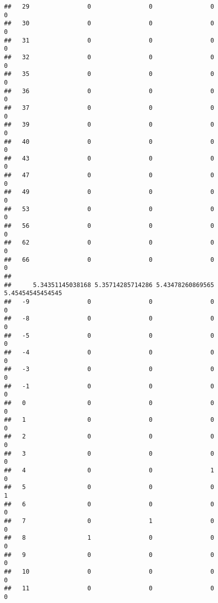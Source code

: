 \documentclass[]{article}
\begin{document}
\begin{verbatim}
##   29                0                0                0                0
##   30                0                0                0                0
##   31                0                0                0                0
##   32                0                0                0                0
##   35                0                0                0                0
##   36                0                0                0                0
##   37                0                0                0                0
##   39                0                0                0                0
##   40                0                0                0                0
##   43                0                0                0                0
##   47                0                0                0                0
##   49                0                0                0                0
##   53                0                0                0                0
##   56                0                0                0                0
##   62                0                0                0                0
##   66                0                0                0                0
##     
##      5.34351145038168 5.35714285714286 5.43478260869565 5.45454545454545
##   -9                0                0                0                0
##   -8                0                0                0                0
##   -5                0                0                0                0
##   -4                0                0                0                0
##   -3                0                0                0                0
##   -1                0                0                0                0
##   0                 0                0                0                0
##   1                 0                0                0                0
##   2                 0                0                0                0
##   3                 0                0                0                0
##   4                 0                0                1                0
##   5                 0                0                0                1
##   6                 0                0                0                0
##   7                 0                1                0                0
##   8                 1                0                0                0
##   9                 0                0                0                0
##   10                0                0                0                0
##   11                0                0                0                0

\end{verbatim}
\end{document}
